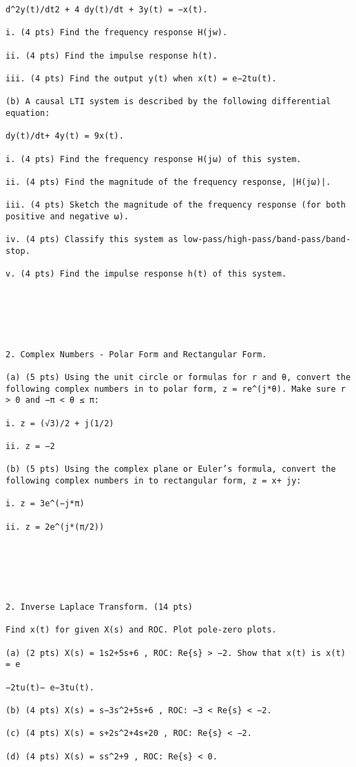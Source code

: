 \documentclass[11pt,addpoints]{exam}
\begin{document}
\begin{verbatim}
d^2y(t)/dt2 + 4 dy(t)/dt + 3y(t) = −x(t).

i. (4 pts) Find the frequency response H(jw).

ii. (4 pts) Find the impulse response h(t).

iii. (4 pts) Find the output y(t) when x(t) = e−2tu(t).

(b) A causal LTI system is described by the following differential equation:

dy(t)/dt+ 4y(t) = 9x(t).

i. (4 pts) Find the frequency response H(jω) of this system.

ii. (4 pts) Find the magnitude of the frequency response, |H(jω)|.

iii. (4 pts) Sketch the magnitude of the frequency response (for both positive and negative ω).

iv. (4 pts) Classify this system as low-pass/high-pass/band-pass/band-stop.

v. (4 pts) Find the impulse response h(t) of this system.






2. Complex Numbers - Polar Form and Rectangular Form.

(a) (5 pts) Using the unit circle or formulas for r and θ, convert the following complex numbers in to polar form, z = re^(j*θ). Make sure r > 0 and −π < θ ≤ π:

i. z = (√3)/2 + j(1/2)

ii. z = −2

(b) (5 pts) Using the complex plane or Euler’s formula, convert the following complex numbers in to rectangular form, z = x+ jy:

i. z = 3e^(−j*π)

ii. z = 2e^(j*(π/2))






2. Inverse Laplace Transform. (14 pts)

Find x(t) for given X(s) and ROC. Plot pole-zero plots.

(a) (2 pts) X(s) = 1s2+5s+6 , ROC: Re{s} > −2. Show that x(t) is x(t) = e

−2tu(t)− e−3tu(t).

(b) (4 pts) X(s) = s−3s^2+5s+6 , ROC: −3 < Re{s} < −2.

(c) (4 pts) X(s) = s+2s^2+4s+20 , ROC: Re{s} < −2.

(d) (4 pts) X(s) = ss^2+9 , ROC: Re{s} < 0.







\end{verbatim}
\end{document}
